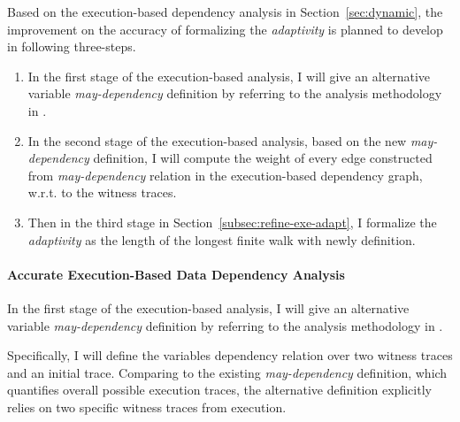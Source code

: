 Based on the execution-based dependency analysis in Section~\ref{sec:dynamic}, the improvement on the accuracy 
of formalizing the
\emph{adaptivity} is planned to develop in following three-steps.
\begin{enumerate}
\item In the first stage of the execution-based analysis, 
I will give an alternative variable \emph{may-dependency} definition 
by referring to the analysis methodology in \cite{Cousot19a}.
%
%
\item In the second stage of the execution-based analysis, 
based on the new \emph{may-dependency} definition,
I will compute the weight of every edge constructed from 
\emph{may-dependency} relation in the execution-based dependency graph, w.r.t. to the witness traces.
%
\item Then in the third stage in Section~\ref{subsec:refine-exe-adapt}, 
I formalize the \emph{adaptivity} as the 
length of the longest finite walk with newly definition. 
\end{enumerate}

\paragraph{Accurate Execution-Based Data Dependency Analysis}
\label{subsec:refine-exe-datadep}
In the first stage of the execution-based analysis, 
I will give an alternative variable \emph{may-dependency} definition 
by referring to the analysis methodology in \cite{Cousot19a}.

Specifically, I will define the variables dependency relation over two witness traces and an initial trace. Comparing to 
the existing \emph{may-dependency} definition, which quantifies overall possible execution traces, the alternative
definition explicitly relies on two specific witness traces from execution.

